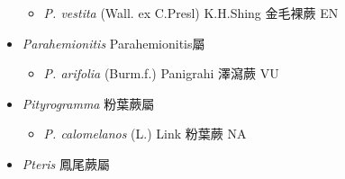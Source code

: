 \begin{itemize}
  \begin{itemize}
        \item[] \textit{P. vestita} (Wall. ex C.Presl) K.H.Shing  金毛裸蕨   EN
  \end{itemize}
 \item[] \textit{Parahemionitis} Parahemionitis屬
                                
  \begin{itemize}
        \item[] \textit{P. arifolia} (Burm.f.) Panigrahi  澤瀉蕨   VU
  \end{itemize}
 \item[] \textit{Pityrogramma} 粉葉蕨屬
                                
  \begin{itemize}
        \item[] \textit{P. calomelanos} (L.) Link  粉葉蕨   NA
  \end{itemize}
 \item[] \textit{Pteris} 鳳尾蕨屬
                                

\end{itemize}
